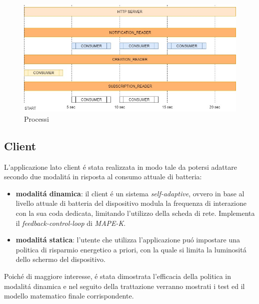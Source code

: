 \documentclass{article}
\begin{document}
\begin{figure}[h!]
\begin{center}
\centering
\includegraphics[width=1.1\textwidth]{stableprocess.jpg} %
\caption{Processi}
\label{fig:Processi}
\end{center}
\end{figure}

\subsection{Client}
L'applicazione lato client \'e stata realizzata in modo tale da potersi adattare secondo due modalit\'a in risposta al consumo attuale di batteria:
\begin{itemize}
\item{\textbf{modalit\'a dinamica}: il client \'e un sistema \textit{self-adaptive}, ovvero in base al livello attuale di batteria del dispositivo modula la frequenza di interazione con la sua coda dedicata, limitando l'utilizzo della scheda di rete. Implementa il \textit{feedback-control-loop} di \textit{MAPE-K}. }
\item{\textbf{modalit\'a statica}: l'utente che utilizza l'applicazione pu\'o impostare una politica di risparmio energetico a priori, con la quale si limita la luminosit\'a dello schermo del dispositivo. }
\end{itemize}
Poich\'e di maggiore interesse, \'e stata dimostrata l'efficacia della politica in modalit\'a dinamica e nel seguito della trattazione verranno mostrati i test ed il modello matematico finale corrispondente.
\end{document}

